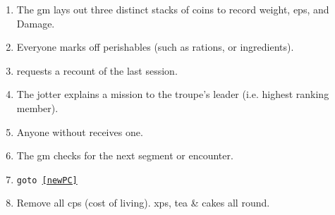 
\begin{enumerate}
  \item
  The \gls{gm} lays out three distinct stacks of coins to record \gls{weight}, \glspl{ep}, and Damage.
  \item
  Everyone marks off perishables (such as \glspl{ration}, or \glspl{ingredient}).
  \item
   requests a recount of the last session.
  \item
  The \gls{jotter} explains a mission to the troupe's leader (i.e. highest ranking member).
  \item
  Anyone without  receives one.
  \label{newPC}
  \item
  The \gls{gm} checks for the next \gls{segment} or encounter.
  \item
  {\tt goto \ref{newPC}}
  \item
  Remove all \glspl{cp} (cost of living).
  \Glspl{xp}, tea \& cakes all round.
\end{enumerate}

